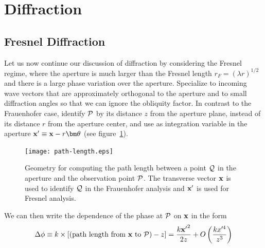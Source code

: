 %
\section{Diffraction }

\subsection{Fresnel Diffraction}

Let us now continue our discussion of diffraction by considering the Fresnel
regime, where the aperture is much larger than the Fresnel length $r_F=(\lambda r)^{1/2}$ and
there is a large phase variation over the aperture. Specialize to incoming wave
vectors that are approximately orthogonal to the aperture and to small 
diffraction angles so that we can ignore the obliquity factor. In contrast 
to the Frauenhofer case, identify $\cal{P}$ by its distance $z$ from the
aperture plane, instead of its distance $r$ from the aperture center, and
use as integration variable in the aperture 
${\bf x'}\equiv{\bf x}-r{\bm\theta}$ (see figure~\ref{fig:path-length}).

\begin{figure}[h!]
	\centering
	\texttt{[image: path-length.eps]}
  \caption{Geometry for computing the path length between a point $\cal{Q}$ in 
the aperture and the observation point $\cal{P}$. The transverse vector 
$\bf{x}$ is used to identify $\cal{Q}$ in the Frauenhofer analysis and 
$\bf{x'}$ is used for Fresnel analysis.}
  \label{fig:path-length}
\end{figure}
\noindent
We can then write the dependence of the phase at $\cal{P}$ on ${\bf x}$ in 
the form
\[
\Delta\phi\equiv k\times[({\rm path~length~from~}{\bf x}~{\rm to}~{\cal P})-z]
 = {k{\bf x'}^2\over 2z}+O\left({kx'^4\over z^3}\right)
\]

